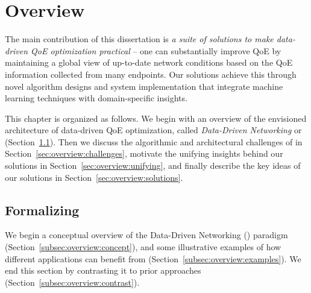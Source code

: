 \chapter{Overview}
\label{ch:overview}

The main contribution of this dissertation is {\em a suite of solutions to make 
data-driven QoE optimization practical} -- one can substantially improve QoE 
by maintaining a global view of up-to-date network conditions based on the 
QoE information collected from many endpoints.
Our solutions achieve this through novel algorithm designs and system 
implementation that integrate machine learning techniques with domain-specific
insights.

This chapter is organized as follows.
We begin with an overview of the envisioned 
architecture of data-driven QoE optimization, 
called {\em Data-Driven Networking} or {\em \ddn} (Section~\ref{sec:overview:arch}).
Then we discuss the algorithmic and architectural challenges of \ddn in 
Section~\ref{sec:overview:challenges}, motivate the unifying insights behind
our solutions in Section~\ref{sec:overview:unifying}, and finally describe
the key ideas of our solutions in Section~\ref{sec:overview:solutions}.


\section{Formalizing \ddn}
\label{sec:overview:arch}

We begin a conceptual overview of the Data-Driven 
Networking (\ddn) paradigm (Section~\ref{subsec:overview:concept}),
and some illustrative examples of how different applications   
can benefit from \ddn (Section~\ref{subsec:overview:examples}).
We end this section by contrasting it to prior
approaches (Section~\ref{subsec:overview:contrast}).

